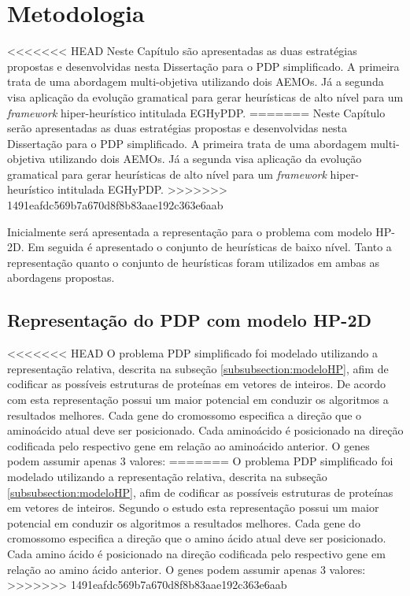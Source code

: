 \chapter{Metodologia}
\label{cap:Metodologia}

<<<<<<< HEAD
Neste Capítulo são apresentadas as duas estratégias propostas e desenvolvidas nesta Dissertação para o PDP simplificado. A primeira trata de uma abordagem multi-objetiva utilizando dois AEMOs. Já a segunda visa aplicação da evolução gramatical  para gerar heurísticas de alto nível para um \textit{framework} hiper-heurístico intitulada EGHyPDP.
=======
Neste Capítulo serão apresentadas as duas estratégias propostas e desenvolvidas nesta Dissertação para o PDP simplificado. A primeira trata de uma abordagem multi-objetiva utilizando dois AEMOs. Já a segunda visa aplicação da evolução gramatical  para gerar heurísticas de alto nível para um \textit{framework} hiper-heurístico intitulada EGHyPDP.
>>>>>>> 1491eafdc569b7a670d8f8b83aae192c363e6aab

Inicialmente será apresentada a representação para o problema com modelo HP-2D. Em seguida é apresentado o conjunto de heurísticas de baixo nível. Tanto a representação quanto o conjunto de heurísticas foram utilizados em ambas as abordagens propostas.

\section{Representação do PDP com modelo HP-2D}

<<<<<<< HEAD
O problema PDP simplificado foi modelado utilizando a representação relativa, descrita na subseção \ref{subsubsection:modeloHP}, afim de codificar as possíveis estruturas de proteínas em vetores de inteiros. De acordo com \cite{krasnogor1999protein} esta representação possui um maior potencial em conduzir os algoritmos a resultados melhores. Cada gene do cromossomo especifica a direção que o aminoácido atual deve ser posicionado. Cada aminoácido é posicionado na direção codificada pelo respectivo gene em relação ao aminoácido anterior. O genes podem assumir apenas 3 valores:
=======
O problema PDP simplificado foi modelado utilizando a representação relativa, descrita na subseção \ref{subsubsection:modeloHP}, afim de codificar as possíveis estruturas de proteínas em vetores de inteiros. Segundo o estudo \cite{krasnogor1999protein} esta representação possui um maior potencial em conduzir os algoritmos a resultados melhores. Cada gene do cromossomo especifica a direção que o amino ácido atual deve ser posicionado. Cada amino ácido é posicionado na direção codificada pelo respectivo gene em relação ao amino ácido anterior. O genes podem assumir apenas 3 valores:
>>>>>>> 1491eafdc569b7a670d8f8b83aae192c363e6aab

